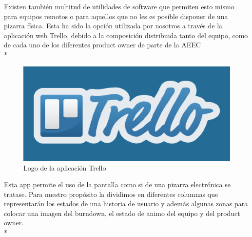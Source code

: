 \documentclass[../pfc.tex]{subfiles}
\begin{document}
	Existen también multitud de utilidades de software que permiten esto mismo para equipos remotos o para aquellos que no les es posible disponer de una pizarra física. Esta ha sido la opción utilizada por nosotros a través de la aplicación web Trello, debido a la composición distribuida tanto del equipo, como de cada uno de los diferentes product owner de parte de la AEEC\\*
	
	\begin{figure}[H]
		\centering
		\includegraphics[width=0.5\linewidth]{../images/TrelloLogo}
		\caption{Logo de la aplicación Trello}
		\label{fig:trello}
	\end{figure}
	
	Esta app permite el uso de la pantalla como si de una pizarra electrónica se tratase. Para nuestro propósito la dividimos en diferentes columnas  que representarán los estados de una historia de usuario y además algunas zonas para colocar una imagen del burndown, el estado de animo del equipo y del product owner.\\*
	
\end{document}
